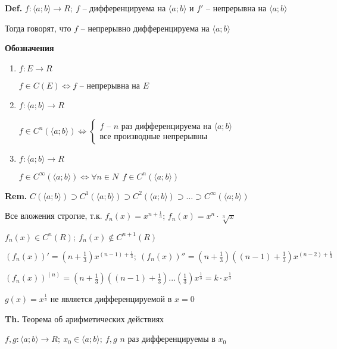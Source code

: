 \documentclass[14pt, letter paper]{article}
\newcommand{\q}[1]{\langle #1 \rangle}
\begin{document}
\textbf{Def.} $f : \q{a; b} \rightarrow R;\ f$ -- дифференцируема на $\q{a; b}$ и $f'$ -- непрерывна на $\q{a; b}$

Тогда говорят, что $f$ -- непрерывно дифференцируема на $\q{a; b}$

\vspace{7mm}

\textbf{Обозначения} \begin{enumerate}
    \item $f : E \rightarrow R$
    
    $f \in C(E) \Leftrightarrow f$ -- непрерывна на $E$

    \item $f : \q{a; b} \rightarrow R$
    
    $f \in C^n(\q{a; b}) \Leftrightarrow \begin{cases}
        f \text{ -- } n \text{ раз дифференцируема на } \q{a; b} \\
        \text{все производные непрерывны}
    \end{cases}$

    \item $f : \q{a; b} \rightarrow R$
    
    $f \in C^{\infty}(\q{a; b}) \Leftrightarrow \forall n \in N\ \ f \in C^n(\q{a; b})$
\end{enumerate}

\vspace{5mm}

\textbf{Rem.} $C(\q{a; b}) \supset C^1(\q{a; b}) \supset C^2(\q{a; b}) \supset ... \supset C^{\infty}(\q{a; b})$

Все вложения строгие, т.к. $f_n(x) = x^{n + \frac{1}{3}}$; $f_n(x) = x^n \cdot \sqrt[3]{x}$

$f_n(x) \in C^n(R);\ f_n(x) \not\in C^{n + 1}(R)$

$(f_n(x))' = (n + \frac{1}{3})x^{(n - 1) + \frac{1}{3}};\ (f_n(x))'' = (n + \frac{1}{3})((n - 1) + \frac{1}{3})x^{(n - 2) + \frac{1}{3}}$

$(f_n(x))^{(n)} = (n + \frac{1}{3})((n - 1) + \frac{1}{3})...(\frac{1}{3})x^{\frac{1}{3}} = k \cdot x^{\frac{1}{3}}$

$g(x) = x^{\frac{1}{3}}$ не является дифференцируемой в $x = 0$

\vspace{5mm}

\textbf{Th.} Теорема об арифметических действиях

$f, g : \q{a; b} \rightarrow R;\ x_0 \in \q{a; b};\ f, g$ $n$ раз дифференцируемы в $x_0$
\end{document}
